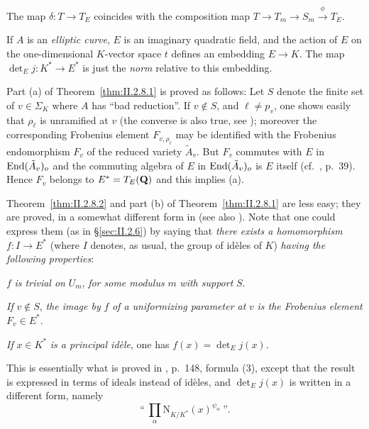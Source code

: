 \begin{theorem}[2]\label{thm:II.2.8.2}
The map $\delta\colon T \to T_E$ coincides with the composition map
$T \to T_m \to S_m \xrightarrow{\ \phi\ } T_E$.
\end{theorem}


If $A$ is an \emph{elliptic curve}, $E$ is an imaginary quadratic field,
and the action of $E$ on the one-dimensional $K$-vector space $t$
defines an embedding $E \to K$.  The map
$\det\nolimits_E j\colon K^* \to E^*$ is just the \emph{norm} relative
to this embedding.


Part (a) of Theorem~\ref{thm:II.2.8.1} is proved as follows: Let $S$
denote the finite set of $v \in \Sigma_K$ where $A$ has ``bad
reduction''.  If $v \notin S$, and $\ell \neq p_v$, one shows easily
that $\rho_\ell$ is unramified at $v$ (the converse is also true, see
\cite{serre-tate-good}); moreover the corresponding Frobenius element
$F_{v,\rho_\ell}$ may be identified with the Frobenius endomorphism
$F_v$ of the reduced variety $\tilde{A}_v$.  But $F_v$ commutes with $E$
in $\mathrm{End}(\tilde{A}_v)_o$ and the commuting algebra of $E$ in
$\mathrm{End}(\tilde{A}_v)_o$ is $E$ itself (cf.~\cite{shimura-taniyama},
p.~39).  Hence $F_v$ belongs to $E^* = T_E(\mathbf{Q})$ and this implies (a).

Theorem~\ref{thm:II.2.8.2} and part (b) of
Theorem~\ref{thm:II.2.8.1} are less easy; they are proved, in a somewhat
different form in \cite{shimura-taniyama} (see also
\cite{serre-tate-good}).  Note that one could express them (as in
\S\ref{sec:II.2.6}) by saying that \emph{there exists a homomorphism}
$f\colon I \to E^*$ (where $I$ denotes, as usual, the group of idèles
of $K$) \emph{having the following properties}:
\begin{alist}
\item $f$ \emph{is trivial on} $U_m$, \emph{for some modulus} $m$
\emph{with support} $S$.
\item \emph{If} $v \notin S$, \emph{the image by} $f$ \emph{of a
uniformizing parameter at} $v$ \emph{is the Frobenius element}
$F_v \in E^*$.
\item \emph{If} $x \in K^*$ \emph{is a principal idèle}, one has
$f(x) = \det\nolimits_E j(x)$.
\end{alist}

This is essentially what is proved in \cite{shimura-taniyama}, p.~148,
formula (3), except that the result is expressed in terms of ideals
instead of idèles, and $\det\nolimits_E j(x)$ is written in a different
form, namely
\[
\text{``}\ \prod_\alpha \mathrm{N}_{K/K^*}(x)^{\psi_\alpha}\ \text{''}.
\]

